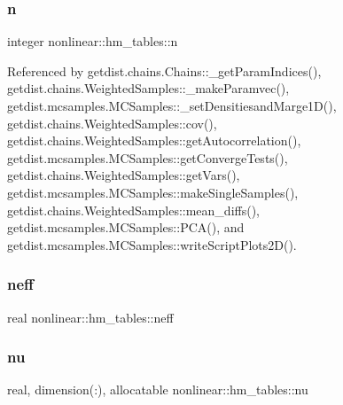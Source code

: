 \mbox{\label{structnonlinear_1_1hm__tables_a9a554d173093fe15ad053c88975806b7}} 
\subsubsection{\texorpdfstring{n}{n}}
{\footnotesize\ttfamily integer nonlinear\+::hm\+\_\+tables\+::n\hspace{0.3cm}{\ttfamily [private]}}



Referenced by getdist.\+chains.\+Chains\+::\+\_\+get\+Param\+Indices(), getdist.\+chains.\+Weighted\+Samples\+::\+\_\+make\+Paramvec(), getdist.\+mcsamples.\+M\+C\+Samples\+::\+\_\+set\+Densitiesand\+Marge1\+D(), getdist.\+chains.\+Weighted\+Samples\+::cov(), getdist.\+chains.\+Weighted\+Samples\+::get\+Autocorrelation(), getdist.\+mcsamples.\+M\+C\+Samples\+::get\+Converge\+Tests(), getdist.\+chains.\+Weighted\+Samples\+::get\+Vars(), getdist.\+mcsamples.\+M\+C\+Samples\+::make\+Single\+Samples(), getdist.\+chains.\+Weighted\+Samples\+::mean\+\_\+diffs(), getdist.\+mcsamples.\+M\+C\+Samples\+::\+P\+C\+A(), and getdist.\+mcsamples.\+M\+C\+Samples\+::write\+Script\+Plots2\+D().

\mbox{\label{structnonlinear_1_1hm__tables_afb7cbcc466d7bd8a59a51843c25d533f}} 
\subsubsection{\texorpdfstring{neff}{neff}}
{\footnotesize\ttfamily real nonlinear\+::hm\+\_\+tables\+::neff\hspace{0.3cm}{\ttfamily [private]}}

\mbox{\label{structnonlinear_1_1hm__tables_ad81962bc57846e090e5af95d1c5715d7}} 
\subsubsection{\texorpdfstring{nu}{nu}}
{\footnotesize\ttfamily real, dimension(\+:), allocatable nonlinear\+::hm\+\_\+tables\+::nu\hspace{0.3cm}{\ttfamily [private]}}

